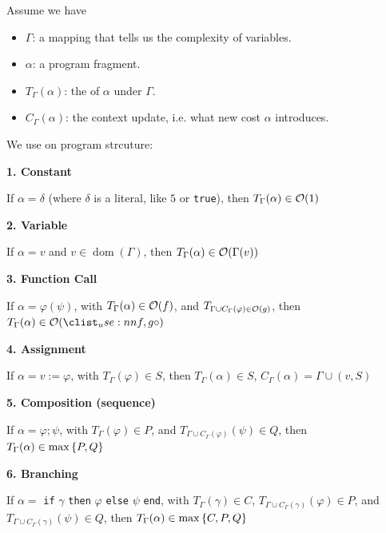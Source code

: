 
Assume we have 
\begin{itemize}
    \item $\Gamma$: a mapping that tells us the complexity of variables.
    \item $\alpha$: a program fragment.
    \item $T_{\Gamma} (\alpha)$: the  of $\alpha$ under $\Gamma$.
    \item $C_{\Gamma} (\alpha)$: the context update, i.e. what new cost $\alpha$ introduces.
\end{itemize}
We use  on program strcuture:

\textbf{1. Constant}

If $\alpha = \delta$ (where $\delta$ is a literal, like $5$ or \texttt{true}), then $T_{\Gamma} (\alpha) \in \mathcal{O}(1)$

\textbf{2. Variable}

If $\alpha = v$ and $v \in \operatorname{dom}(\Gamma)$, then $T_{\Gamma} (\alpha) \in \mathcal{O}(\Gamma (v))$

\textbf{3. Function Call}

If $\alpha = \varphi (\psi)$, with $T_{\Gamma} (\alpha) \in \mathcal{O}(f)$, and $T_{\Gamma \cup C_{\Gamma} (\varphi) \in \mathcal{O}(g)}$, then $T_{\Gamma} (\alpha) \in \bigo{\compose{f,g}}$

\textbf{4. Assignment}

If $\alpha = v := \varphi$, with $T_{\Gamma} (\varphi) \in S$, then $T_{\Gamma} (\alpha) \in S$, $C_{\Gamma} (\alpha) = \Gamma \cup (v, S)$

\textbf{5. Composition (sequence)}

If $\alpha = \varphi;\psi$, with $T_{\Gamma} (\varphi) \in P$, and $T_{\Gamma \cup C_{\Gamma}(\varphi)}(\psi) \in Q$, then $T_{\Gamma} (\alpha) \in \operatorname{max}\left\{P,Q\right\}$

\textbf{6. Branching}

If $\alpha = $ \texttt{if} $\gamma$ \texttt{then} $\varphi$ \texttt{else} $\psi$ \texttt{end}, with $T_{\Gamma} (\gamma) \in C$, $T_{\Gamma \cup C_{\Gamma}(\gamma)}(\varphi) \in P$, and $T_{\Gamma \cup C_{\Gamma}(\gamma)}(\psi) \in Q$, then $T_{\Gamma} (\alpha) \in \operatorname{max}\left\{C,P,Q\right\}$

